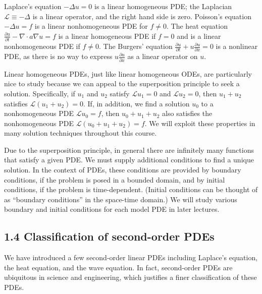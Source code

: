 \begin{example}[][1.8]
    Laplace's equation $-\Delta u = 0$ is a linear homogeneous PDE; the Laplacian $\mathcal{L} \equiv -\Delta$ is a linear operator, and the right hand side is zero. Poisson's equation $-\Delta u = f$ is a linear nonhomogeneous PDE for $f \neq 0$. The heat equation $\frac{\partial u}{\partial t} - \nabla \cdot a \nabla u = f$ is a linear homogeneous PDE if $f = 0$ and is a linear nonhomogeneous PDE if $f \neq 0$. The Burgers' equation $\frac{\partial u}{\partial t} + u \frac{\partial u}{\partial x} = 0$ is a nonlinear PDE, as there is no way to express $u \frac{\partial u}{\partial x}$ as a linear operator on $u$.
\end{example}

Linear homogeneous PDEs, just like linear homogeneous ODEs, are particularly nice to study because we can appeal to the superposition principle to seek a solution. Specifically, if $u_1$ and $u_2$ satisfy $\mathcal{L} u_1 = 0$ and $\mathcal{L} u_2 = 0$, then $u_1 + u_2$ satisfies $\mathcal{L}(u_1 + u_2) = 0$. If, in addition, we find a solution $u_0$ to a nonhomogeneous PDE $\mathcal{L} u_0 = f$, then $u_0 + u_1 + u_2$ also satisfies the nonhomogeneous PDE $\mathcal{L}(u_0 + u_1 + u_2) = f$. We will exploit these properties in many solution techniques throughout this course.

Due to the superposition principle, in general there are infinitely many functions that satisfy a given PDE. We must supply additional conditions to find a unique solution. In the context of PDEs, these conditions are provided by boundary conditions, if the problem is posed in a bounded domain, and by initial conditions, if the problem is time-dependent. (Initial conditions can be thought of as ``boundary conditions'' in the space-time domain.) We will study various boundary and initial conditions for each model PDE in later lectures.

\subsection{1.4 Classification of second-order PDEs}
We have introduced a few second-order linear PDEs including Laplace's equation, the heat equation, and the wave equation. In fact, second-order PDEs are ubiquitous in science and engineering, which justifies a finer classification of these PDEs.

